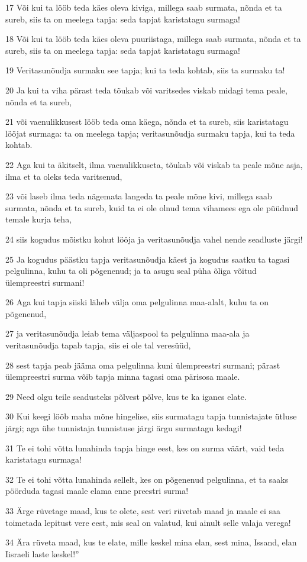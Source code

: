 \par 17 Või kui ta lööb teda käes oleva kiviga, millega saab surmata, nõnda et ta sureb, siis ta on meelega tapja: seda tapjat karistatagu surmaga!
\par 18 Või kui ta lööb teda käes oleva puuriistaga, millega saab surmata, nõnda et ta sureb, siis ta on meelega tapja: seda tapjat karistatagu surmaga!
\par 19 Veritasunõudja surmaku see tapja; kui ta teda kohtab, siis ta surmaku ta!
\par 20 Ja kui ta viha pärast teda tõukab või varitsedes viskab midagi tema peale, nõnda et ta sureb,
\par 21 või vaenulikkusest lööb teda oma käega, nõnda et ta sureb, siis karistatagu lööjat surmaga: ta on meelega tapja; veritasunõudja surmaku tapja, kui ta teda kohtab.
\par 22 Aga kui ta äkitselt, ilma vaenulikkuseta, tõukab või viskab ta peale mõne asja, ilma et ta oleks teda varitsenud,
\par 23 või laseb ilma teda nägemata langeda ta peale mõne kivi, millega saab surmata, nõnda et ta sureb, kuid ta ei ole olnud tema vihamees ega ole püüdnud temale kurja teha,
\par 24 siis kogudus mõistku kohut lööja ja veritasunõudja vahel nende seadluste järgi!
\par 25 Ja kogudus päästku tapja veritasunõudja käest ja kogudus saatku ta tagasi pelgulinna, kuhu ta oli põgenenud; ja ta asugu seal püha õliga võitud ülempreestri surmani!
\par 26 Aga kui tapja siiski läheb välja oma pelgulinna maa-alalt, kuhu ta on põgenenud,
\par 27 ja veritasunõudja leiab tema väljaspool ta pelgulinna maa-ala ja veritasunõudja tapab tapja, siis ei ole tal veresüüd,
\par 28 sest tapja peab jääma oma pelgulinna kuni ülempreestri surmani; pärast ülempreestri surma võib tapja minna tagasi oma pärisosa maale.
\par 29 Need olgu teile seadusteks põlvest põlve, kus te ka iganes elate.
\par 30 Kui keegi lööb maha mõne hingelise, siis surmatagu tapja tunnistajate ütluse järgi; aga ühe tunnistaja tunnistuse järgi ärgu surmatagu kedagi!
\par 31 Te ei tohi võtta lunahinda tapja hinge eest, kes on surma väärt, vaid teda karistatagu surmaga!
\par 32 Te ei tohi võtta lunahinda sellelt, kes on põgenenud pelgulinna, et ta saaks pöörduda tagasi maale elama enne preestri surma!
\par 33 Ärge rüvetage maad, kus te olete, sest veri rüvetab maad ja maale ei saa toimetada lepitust vere eest, mis seal on valatud, kui ainult selle valaja verega!
\par 34 Ära rüveta maad, kus te elate, mille keskel mina elan, sest mina, Issand, elan Iisraeli laste keskel!”

